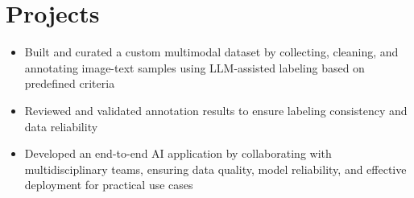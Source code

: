 \section*{Projects}
\vspace{-0.3em}
\begin{itemize}
  \item Built and curated a custom multimodal dataset by collecting, cleaning, and annotating image-text samples using LLM-assisted labeling based on predefined criteria
  \item Reviewed and validated annotation results to ensure labeling consistency and data reliability
  \item Developed an end-to-end AI application by collaborating with multidisciplinary teams, ensuring data quality, model reliability, and effective deployment for practical use cases
\end{itemize}

